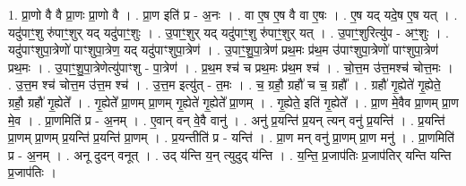 \documentclass[17pt]{extarticle}
\begin{document}
1. प्रा॒णो वै वै प्रा॒णः प्रा॒णो वै । . प्रा॒ण इति॑ प्र - अ॒नः । . वा ए॒ष ए॒ष वै वा ए॒षः । . ए॒ष यद् यदे॒ष ए॒ष यत् । . यदु॑पाꣳ॒॒शु रु॑पाꣳ॒॒शुर् यद् यदु॑पाꣳ॒॒शुः । . उ॒पाꣳ॒॒शुर् यद् यदु॑पाꣳ॒॒शु रु॑पाꣳ॒॒शुर् यत् । . उ॒पाꣳ॒॒शुरित्यु॑प - अꣳ॒॒शुः । . यदु॑पाꣳशुपा॒त्रेणो॑ पाꣳशुपा॒त्रेण॒ यद् यदु॑पाꣳशुपा॒त्रेण॑ । . उ॒पाꣳ॒॒शु॒पा॒त्रेण॑ प्रथ॒मः प्र॑थ॒म उ॑पाꣳशुपा॒त्रेणो॑ पाꣳशुपा॒त्रेण॑ प्रथ॒मः । . उ॒पाꣳ॒॒शु॒पा॒त्रेणेत्यु॑पाꣳशु - पा॒त्रेण॑ । . प्र॒थ॒म श्च॑ च प्रथ॒मः प्र॑थ॒म श्च॑ । . चो॒त्त॒म उ॑त्त॒मश्च॑ चोत्त॒मः । . उ॒त्त॒म श्च॑ चोत्त॒म उ॑त्त॒म श्च॑ । . उ॒त्त॒म इत्यु॑त् - त॒मः । . च॒ ग्रहौ॒ ग्रहौ॑ च च॒ ग्रहौ᳚ । . ग्रहौ॑ गृ॒ह्येते॑ गृ॒ह्येते॒ ग्रहौ॒ ग्रहौ॑ गृ॒ह्येते᳚ । . गृ॒ह्येते᳚ प्रा॒णम् प्रा॒णम् गृ॒ह्येते॑ गृ॒ह्येते᳚ प्रा॒णम् । . गृ॒ह्येते॒ इति॑ गृ॒ह्येते᳚ । . प्रा॒ण मे॒वैव प्रा॒णम् प्रा॒ण मे॒व । . प्रा॒णमिति॑ प्र - अ॒नम् । . ए॒वान् वन् वे॒वै वानु॑ । . अनु॑ प्र॒यन्ति॑ प्र॒यन् त्यन् वनु॑ प्र॒यन्ति॑ । . प्र॒यन्ति॑ प्रा॒णम् प्रा॒णम् प्र॒यन्ति॑ प्र॒यन्ति॑ प्रा॒णम् । . प्र॒यन्तीति॑ प्र - यन्ति॑ । . प्रा॒ण मन् वनु॑ प्रा॒णम् प्रा॒ण मनु॑ । . प्रा॒णमिति॑ प्र - अ॒नम् । . अनू दुदन् वनूत् । . उद् य॑न्ति य॒न् त्युदुद् य॑न्ति । . य॒न्ति॒ प्र॒जाप॑तिः प्र॒जाप॑तिर् यन्ति यन्ति प्र॒जाप॑तिः । \newline
\end{document}
